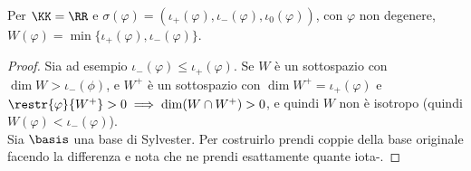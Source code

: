 \documentclass[11pt]{article}
\begin{document}
	\begin{proposition}
		Per $\KK = \RR$ e $\sigma(\varphi) = (\iota_+(\varphi), \iota_-(\varphi), \iota_0(\varphi))$, con $\varphi$ non degenere,
		$W(\varphi) = \min\{\iota_+(\varphi), \iota_-(\varphi)\}$.
	\end{proposition}

	\begin{proof}
		Sia ad esempio $\iota_-(\varphi) \leq \iota_+(\varphi)$. Se $W$
		è un sottospazio con $\dim W > \iota_-(\phi)$, e $W^+$ è
		un sottospazio con $\dim W^+ = \iota_+(\varphi)$ e $\restr{\varphi}{W^+} > 0 \implies \dim (W \cap W^+) > 0$,
		e quindi $W$ non è isotropo (quindi $W(\varphi) < \iota_-(\varphi)$). \\
		
		Sia $\basis$ una base di Sylvester. Per costruirlo prendi
		coppie della base originale facendo la differenza e nota
		che ne prendi esattamente quante iota-.
	\end{proof}
\end{document}
